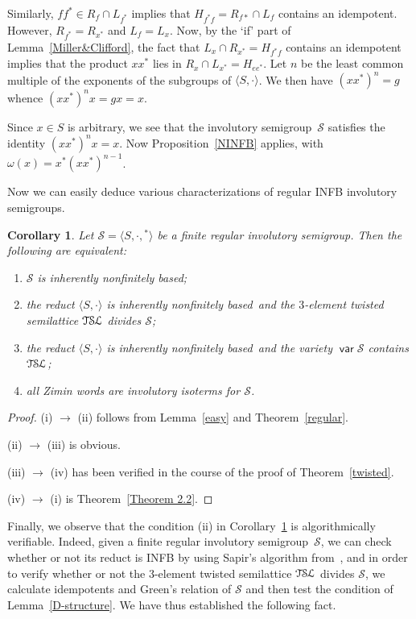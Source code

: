 \documentclass[11pt,reqno]{amsart}
\def\om{\omega}
\newcommand{\is}{involutory semi\-group}
\newcommand{\iss}{involutory semi\-groups}
\newcommand{\infb}{inherently non\-finitely based}
\newcommand{\TSL}{\ensuremath{\mathcal{T\kern-.5pt S\kern-.5pt L}}}
\newtheorem{Cor}[Thm]{Corollary}
\DeclareMathOperator{\var}{\mathsf{var}}
\begin{document}
Similarly, $ff^*\in R_f\cap L_{f^*}$ implies that $H_{f^*f}=R_{f*}\cap L_f$ contains an idempotent. However, $R_{f^*}=R_{x^*}$ and
$L_f=L_x$. Now, by the `if' part of Lemma~\ref{Miller&Clifford}, the fact that $L_x\cap R_{x^*}=H_{f^*f}$ contains an idempotent implies
that the product $xx^*$ lies in $R_x\cap L_{x^*}=H_{ee^*}$. Let $n$ be the least common multiple of the exponents of the subgroups of
$\langle S,\cdot\rangle$. We then have $(xx^*)^n=g$ whence $(xx^*)^nx=gx=x$.

Since $x\in S$ is arbitrary, we see that the \is\ $\mathcal{S}$ satisfies the identity $(xx^*)^nx=x$. Now Proposition~\ref{NINFB} applies,
with $\om(x)=x^*(xx^*)^{n-1}$.

Now we can easily deduce various characterizations of regular INFB \iss.
\renewcommand{\labelenumi}{(\roman{enumi})}
\begin{Cor}
\label{characterization} Let $\mathcal{S}=\langle S,\cdot,{}^*\rangle$ be a finite regular \is. Then the following are equivalent:
\begin{enumerate}
\item $\mathcal{S}$ is \infb;
\item the reduct $\langle S,\cdot\rangle$ is \infb\ and the $3$-element twisted semilattice $\TSL$ divides $\mathcal{S}$;
\item the reduct $\langle S,\cdot\rangle$ is \infb\ and the variety $\var\mathcal{S}$ contains $\TSL$;
\item all Zimin words are involutory isoterms for $\mathcal{S}$.
\end{enumerate}
\end{Cor}

\begin{proof}
(i) $\to$ (ii) follows from Lemma~\ref{easy} and Theorem~\ref{regular}.

(ii) $\to$ (iii) is obvious.

(iii) $\to$ (iv) has been verified in the course of the proof of Theorem~\ref{twisted}.

(iv) $\to$ (i) is Theorem~\ref{Theorem 2.2}.
\end{proof}

Finally, we observe that the condition (ii) in Corollary~\ref{characterization} is algorithmically verifiable. Indeed, given a finite
regular \is\ $\mathcal{S}$, we can check whether or not its reduct is INFB by using Sapir's algorithm from~\cite{Sapir:1987}, and in order
to verify whether or not the $3$-element twisted semilattice $\TSL$ divides $\mathcal{S}$, we calculate idempotents and Green's relation of
$\mathcal{S}$ and then test the condition of Lemma~\ref{D-structure}. We have thus established the following fact.
\end{document}
